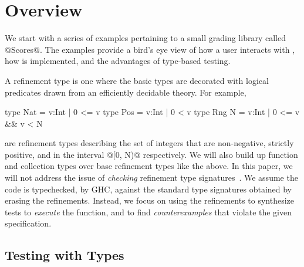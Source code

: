 \section{Overview}\label{sec:overview}

We start with a series of examples pertaining to a small grading
library called @Scores@. The examples provide a bird's eye view of 
how a user interacts with \toolname, how \toolname is implemented,
and the advantages of type-based testing.

A refinement type is one where the basic types are decorated 
with logical predicates drawn from an efficiently decidable 
theory. For example,
%
\begin{code}
  type Nat   = {v:Int | 0 <= v}
  type Pos   = {v:Int | 0 <  v}
  type Rng N = {v:Int | 0 <= v && v <  N}
\end{code}
%
are refinement types describing the set of integers that are 
non-negative, strictly positive, and in the interval @[0, N)@ 
respectively. We will also build up function and collection 
types over base refinement types like the above. 
%
In this paper, we will not address the issue of \emph{checking}
refinement type signatures~\cite{VazouICFP14}.
%
We assume the code is typechecked, \eg by GHC, against the 
standard type signatures obtained by erasing the refinements.
Instead, we focus on using the refinements to 
synthesize tests to \emph{execute} the function, and to find 
\emph{counterexamples} that violate %
the given specification.

\subsection{Testing with Types}

